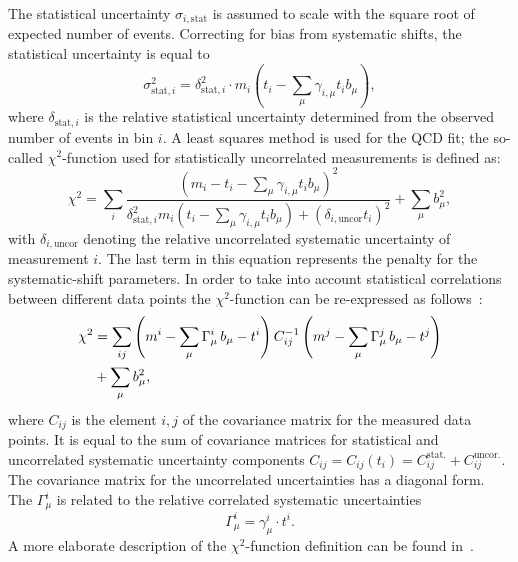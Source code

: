 The statistical uncertainty $\sigma_{i,\text{stat}}$ is assumed to scale with the square root of expected number of events. Correcting for bias from systematic shifts, the statistical uncertainty is equal to
\begin{equation}
 \sigma_{\text{stat},i}^2 = \delta_{\text{stat},i}^2\cdot m_i\left( t_i - \sum_\mu\gamma_{i,\mu}t_ib_\mu \right),
\end{equation}
where $\delta_{\text{stat},i}$ is the relative statistical uncertainty determined from the observed number of events in bin $i$. A least squares method is used for the QCD fit; the so-called $\chi^2$-function used for statistically uncorrelated measurements is defined as:
\begin{equation}
 \chi^2 = \sum_i{ \frac{\left( m_i-t_i-\sum_{\mu}{\gamma_{i,\mu} t_i b_\mu} \right)^2 }{ \delta_{\text{stat},i}^2 m_i \left( t_i - \sum_\mu{\gamma_{i,\mu}t_ib_\mu} \right)+ \left( \delta_{i,\text{uncor}}t_i\right)^2 } } + \sum_{\mu}{b_\mu^2},
 \label{eq:chi2uncorr}
\end{equation}
with $\delta_{i,\text{uncor}}$ denoting the relative uncorrelated systematic uncertainty of measurement $i$. The last term in this equation represents the penalty for the systematic-shift parameters. In order to take into account statistical correlations between different data points the $\chi^2$-function can be re-expressed as follows~\cite{Aaron:2009aa}:
\begin{align}
 \chi^2 &= \sum_{ij}{\left( m^i -\sum_{\mu}{\Gamma_\mu^i\,b_\mu - t^i }\right) C^{-1}_{ij} \left( m^j -\sum_{\mu}{\Gamma_\mu^j\,b_\mu - t^j }\right) }\notag\\
                                           &+ \sum_{\mu}{b_\mu^2},
 \label{eq:chi2corr}
\end{align}
where $C_{ij}$ is the element $i,j$ of the covariance matrix for the measured data points. It is equal to the sum of covariance matrices for statistical and uncorrelated systematic uncertainty components $C_{ij}=C_{ij}\left(t_i\right)=C_{ij}^{\text{stat.}}+C_{ij}^{\text{uncor.}}$. The covariance matrix for the uncorrelated uncertainties has a diagonal form. The $\Gamma_\mu^i$ is related to the relative correlated systematic uncertainties
\begin{equation}
 \Gamma_{\mu}^i = \gamma_{\mu}^i \cdot t^i. 
\end{equation}
A more elaborate description of the $\chi^2$-function definition can be found in~\cite{herafitter:2014:manual}.

